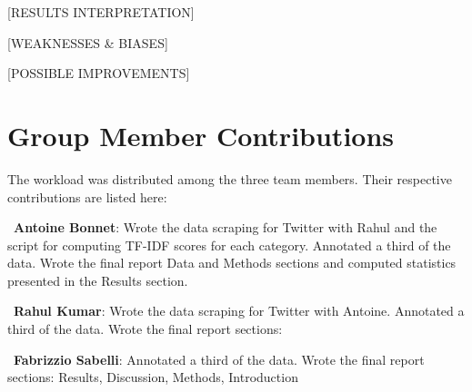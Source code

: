 \documentclass[letterpaper]{article} %
\begin{document}


[RESULTS INTERPRETATION]

[WEAKNESSES \& BIASES]

[POSSIBLE IMPROVEMENTS]


\section{Group Member Contributions}

The workload was distributed among the three team members. Their respective contributions are listed here: 

\  \textbf{Antoine Bonnet}: Wrote the data scraping for Twitter with Rahul and the script for computing TF-IDF scores for each category. Annotated a third of the data. Wrote the final report Data and Methods sections and computed statistics presented in the Results section.

\  \textbf{Rahul Kumar}: Wrote the data scraping for Twitter with Antoine. Annotated a third of the data. Wrote the final report sections:  

\  \textbf{Fabrizzio Sabelli}: Annotated a third of the data. Wrote the final report sections: Results, Discussion, Methods, Introduction  
  
  
\end{document}
